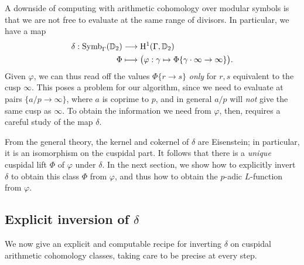 \documentclass[a4paper,11pt]{article}
\numberwithin{equation}{section}
\begin{document}

A downside of computing with arithmetic cohomology over modular symbols is that we are not free to evaluate at the same range of divisors. In particular, we have a map
\begin{align*}
	\delta : \mathrm{Symb}_{\Gamma}(\mathbb{D}_2) &\longrightarrow \mathrm{H}^1(\Gamma,\mathbb{D}_2)\\
    \Phi &\longmapsto \big(\varphi: \gamma \mapsto \Phi\{\gamma\cdot\infty \rightarrow \infty\}\big).
\end{align*}
 Given $\varphi$, we can thus read off the values $\Phi\{r \to s\}$ \emph{only} for $r,s$ equivalent to the cusp $\infty$. This poses a problem for our algorithm, since we need to evaluate at pairs $\{a/p \to \infty\}$, where $a$ is coprime to $p$, and in general $a/p$ will \emph{not} give the same cusp as $\infty$. To obtain the information we need from $\varphi$, then, requires a careful study of the map $\delta$.

From the general theory, the kernel and cokernel of $\delta$ are Eisenstein; in particular, it is an isomorphism on the cuspidal part. It follows that there is a \emph{unique} cuspidal lift $\Phi$ of $\varphi$ under $\delta$. In the next section, we show how to explicitly invert $\delta$ to obtain this class $\Phi$ from $\varphi$, and thus how to obtain the $p$-adic $L$-function from $\varphi$.



\subsection{Explicit inversion of $\delta$}

We now give an explicit and computable recipe for inverting $\delta$ on cuspidal arithmetic cohomology classes, taking care to be precise at every step.
\end{document}
